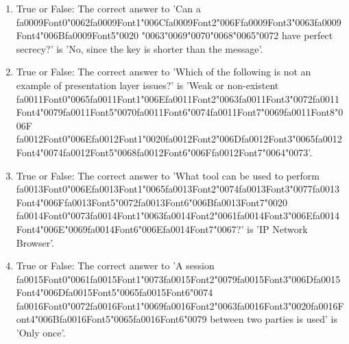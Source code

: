 \documentclass[12pt]{article}
\begin{document}
\begin{enumerate}[label=\arabic*.]
\item True or False: The correct answer to 'Can a {\csname fa0009Font0\endcsname\char"0062}{\csname fa0009Font1\endcsname\char"006C}{\csname fa0009Font2\endcsname\char"006F}{\csname fa0009Font3\endcsname\char"0063}{\csname fa0009Font4\endcsname\char"006B}{\csname fa0009Font5\endcsname\char"0020} {\char"0063}{\char"0069}{\char"0070}{\char"0068}{\char"0065}{\char"0072} have perfect secrecy?' is 'No, since the key is shorter than the message'.
\item True or False: The correct answer to 'Which of the following is not an example of presentation layer issues?' is 'Weak or non-existent {\csname fa0011Font0\endcsname\char"0065}{\csname fa0011Font1\endcsname\char"006E}{\csname fa0011Font2\endcsname\char"0063}{\csname fa0011Font3\endcsname\char"0072}{\csname fa0011Font4\endcsname\char"0079}{\csname fa0011Font5\endcsname\char"0070}{\csname fa0011Font6\endcsname\char"0074}{\csname fa0011Font7\endcsname\char"0069}{\csname fa0011Font8\endcsname\char"006F} {\csname fa0012Font0\endcsname\char"006E}{\csname fa0012Font1\endcsname\char"0020}{\csname fa0012Font2\endcsname\char"006D}{\csname fa0012Font3\endcsname\char"0065}{\csname fa0012Font4\endcsname\char"0074}{\csname fa0012Font5\endcsname\char"0068}{\csname fa0012Font6\endcsname\char"006F}{\csname fa0012Font7\endcsname\char"0064}{\char"0073}'.
\item True or False: The correct answer to 'What tool can be used to perform {\csname fa0013Font0\endcsname\char"006E}{\csname fa0013Font1\endcsname\char"0065}{\csname fa0013Font2\endcsname\char"0074}{\csname fa0013Font3\endcsname\char"0077}{\csname fa0013Font4\endcsname\char"006F}{\csname fa0013Font5\endcsname\char"0072}{\csname fa0013Font6\endcsname\char"006B}{\csname fa0013Font7\endcsname\char"0020} {\csname fa0014Font0\endcsname\char"0073}{\csname fa0014Font1\endcsname\char"0063}{\csname fa0014Font2\endcsname\char"0061}{\csname fa0014Font3\endcsname\char"006E}{\csname fa0014Font4\endcsname\char"006E}{\char"0069}{\csname fa0014Font6\endcsname\char"006E}{\csname fa0014Font7\endcsname\char"0067}?' is 'IP Network Browser'.
\item True or False: The correct answer to 'A session {\csname fa0015Font0\endcsname\char"0061}{\csname fa0015Font1\endcsname\char"0073}{\csname fa0015Font2\endcsname\char"0079}{\csname fa0015Font3\endcsname\char"006D}{\csname fa0015Font4\endcsname\char"006D}{\csname fa0015Font5\endcsname\char"0065}{\csname fa0015Font6\endcsname\char"0074} {\csname fa0016Font0\endcsname\char"0072}{\csname fa0016Font1\endcsname\char"0069}{\csname fa0016Font2\endcsname\char"0063}{\csname fa0016Font3\endcsname\char"0020}{\csname fa0016Font4\endcsname\char"006B}{\csname fa0016Font5\endcsname\char"0065}{\csname fa0016Font6\endcsname\char"0079} between two parties is used' is 'Only once'.

\end{enumerate}
\end{document}
